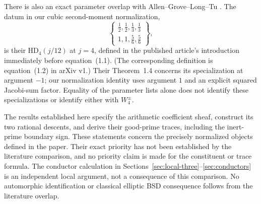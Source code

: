 There is also an exact parameter overlap with Allen--Grove--Long--Tu
\cite{EHMM2}. The datum in our cubic second-moment normalization,
\[
 \left\{\begin{matrix}
 \tfrac12,\tfrac12,\tfrac13,\tfrac13\\
 1,1,\tfrac56,\tfrac56
 \end{matrix}\right\},
\]
is their $\mathrm{HD}_4(j/12)$ at $j=4$, defined in the published
article's introduction immediately before equation~(1.1).
(The corresponding definition is equation~(1.2) in arXiv v1.)
Their Theorem~1.4 concerns its specialization at argument $-1$;
our normalization identity uses argument $1$ and an explicit squared
Jacobi-sum factor. Equality of the parameter lists alone does not
identify these specializations or identify either with $W_4^\pm$.

The results established here specify the arithmetic coefficient sheaf,
construct its two rational descents, and derive their good-prime traces,
including the inert-prime boundary sign. These statements concern the
precisely normalized objects defined in the paper. Their exact priority
has not been established by the literature comparison, and no priority
claim is made for the constituent or trace formula. The conductor calculation in Sections~\ref{sec:local-three}--\ref{sec:conductors}
is an independent local argument, not a consequence of this comparison.
No automorphic identification or classical elliptic BSD consequence
follows from the literature overlap.
